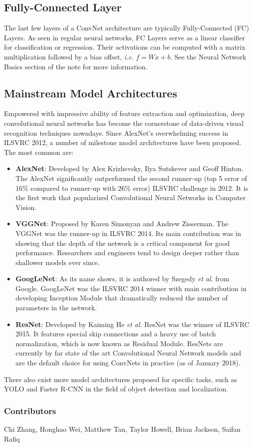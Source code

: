 \documentclass[twoside]{article}
\begin{document}
\subsection{Fully-Connected Layer}
The last few layers of a ConvNet architecture are typically Fully-Connected (FC) Layers. As seen in regular neural networks, FC Layers serve as a linear classifier for classification or regression. Their activations can be computed with a matrix multiplication followed by a bias offset, \textit{i.e.} $f = Wx + b$. See the Neural Network Basics section of the note for more information.

\subsection{Mainstream Model Architectures}
Empowered with impressive ability of feature extraction and optimization, deep convolutional neural networks has become the cornerstone of data-driven visual recognition techniques nowadays. Since AlexNet's overwhelming success in ILSVRC 2012, a number of milestone model architectures have been proposed. The most common are:
\begin{itemize}
\item \textbf{AlexNet}\cite{alexnet}: Developed by Alex Krizhevsky, Ilya Sutskever and Geoff Hinton. The AlexNet significantly outperformed the second runner-up (top 5 error of 16\% compared to runner-up with 26\% error) ILSVRC challenge in 2012. It is the first work that popularized Convolutional Neural Networks in Computer Vision.
\item \textbf{VGGNet}\cite{vggnet}: Proposed by Karen Simonyan and Andrew Zisserman. The VGGNet was the runner-up in ILSVRC 2014. Its main contribution was in showing that the depth of the network is a critical component for good performance. Researchers and engineers tend to design deeper rather than shallower models ever since.
\item \textbf{GoogLeNet}\cite{googlenet}: As its name shows, it is authored by Szegedy \textit{et al.} from Google. GoogLeNet was the ILSVRC 2014 winner with main contribution in developing Inception Module that dramatically reduced the number of parameters in the network.
\item \textbf{ResNet}\cite{resnet}:  Developed by Kaiming He \textit{et al.} ResNet was the winner of ILSVRC 2015. It features special skip connections and a heavy use of batch normalization, which is now known as Residual Module. ResNets are currently by far state of the art Convolutional Neural Network models and are the default choice for using ConvNets in practice (as of January 2018).
\end{itemize}

There also exist more model architectures proposed for specific tasks, such as YOLO\cite{yolo} and Faster R-CNN\cite{faster_rcnn} in the field of object detection and localization.




\subsubsection*{Contributors}
Chi Zhang, Honghao Wei, Matthew Tan, Taylor Howell, Brian Jackson, Saifan Rafiq
\end{document}
